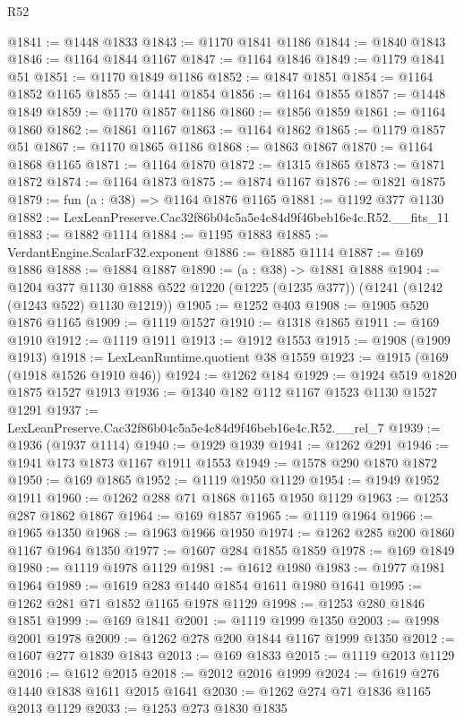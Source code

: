 \begin{lexlean}{R52}
\begin{coremodule}
@1841 := @1448 @1833
@1843 := @1170 @1841 @1186
@1844 := @1840 @1843
@1846 := @1164 @1844 @1167
@1847 := @1164 @1846
@1849 := @1179 @1841 @51
@1851 := @1170 @1849 @1186
@1852 := @1847 @1851
@1854 := @1164 @1852 @1165
@1855 := @1441 @1854
@1856 := @1164 @1855
@1857 := @1448 @1849
@1859 := @1170 @1857 @1186
@1860 := @1856 @1859
@1861 := @1164 @1860
@1862 := @1861 @1167
@1863 := @1164 @1862
@1865 := @1179 @1857 @51
@1867 := @1170 @1865 @1186
@1868 := @1863 @1867
@1870 := @1164 @1868 @1165
@1871 := @1164 @1870
@1872 := @1315 @1865
@1873 := @1871 @1872
@1874 := @1164 @1873
@1875 := @1874 @1167
@1876 := @1821 @1875
@1879 := fun (a : @38) => @1164 @1876 @1165
@1881 := @1192 @377 @1130
@1882 := LexLeanPreserve.Cac32f86b04c5a5e4c84d9f46beb16e4c.R52.__fits_11
@1883 := @1882 @1114
@1884 := @1195 @1883
@1885 := VerdantEngine.ScalarF32.exponent
@1886 := @1885 @1114
@1887 := @169 @1886
@1888 := @1884 @1887
@1890 := (a : @38) -> @1881 @1888
@1904 := @1204
    @377
    @1130
    @1888
    @522
    @1220
    (@1225 (@1235 @377))
    (@1241 (@1242 (@1243 @522) @1130 @1219))
@1905 := @1252 @403
@1908 := @1905 @520 @1876 @1165
@1909 := @1119 @1527
@1910 := @1318 @1865
@1911 := @169 @1910
@1912 := @1119 @1911
@1913 := @1912 @1553
@1915 := @1908 (@1909 @1913)
@1918 := LexLeanRuntime.quotient @38 @1559
@1923 := @1915 (@169 (@1918 @1526 @1910 @46))
@1924 := @1262 @184
@1929 := @1924 @519 @1820 @1875 @1527 @1913
@1936 := @1340 @182 @112 @1167 @1523 @1130 @1527 @1291
@1937 := LexLeanPreserve.Cac32f86b04c5a5e4c84d9f46beb16e4c.R52.__rel_7
@1939 := @1936 (@1937 @1114)
@1940 := @1929 @1939
@1941 := @1262 @291
@1946 := @1941 @173 @1873 @1167 @1911 @1553
@1949 := @1578 @290 @1870 @1872
@1950 := @169 @1865
@1952 := @1119 @1950 @1129
@1954 := @1949 @1952 @1911
@1960 := @1262 @288 @71 @1868 @1165 @1950 @1129
@1963 := @1253 @287 @1862 @1867
@1964 := @169 @1857
@1965 := @1119 @1964
@1966 := @1965 @1350
@1968 := @1963 @1966 @1950
@1974 := @1262 @285 @200 @1860 @1167 @1964 @1350
@1977 := @1607 @284 @1855 @1859
@1978 := @169 @1849
@1980 := @1119 @1978 @1129
@1981 := @1612 @1980
@1983 := @1977 @1981 @1964
@1989 := @1619 @283 @1440 @1854 @1611 @1980 @1641
@1995 := @1262 @281 @71 @1852 @1165 @1978 @1129
@1998 := @1253 @280 @1846 @1851
@1999 := @169 @1841
@2001 := @1119 @1999 @1350
@2003 := @1998 @2001 @1978
@2009 := @1262 @278 @200 @1844 @1167 @1999 @1350
@2012 := @1607 @277 @1839 @1843
@2013 := @169 @1833
@2015 := @1119 @2013 @1129
@2016 := @1612 @2015
@2018 := @2012 @2016 @1999
@2024 := @1619 @276 @1440 @1838 @1611 @2015 @1641
@2030 := @1262 @274 @71 @1836 @1165 @2013 @1129
@2033 := @1253 @273 @1830 @1835

\end{coremodule}
\end{lexlean}
